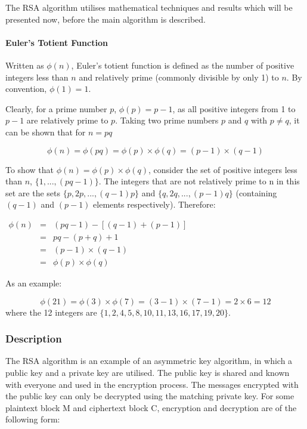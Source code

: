 \documentclass[a4paper,10pt]{report}
\begin{document}
The RSA algorithm utilises mathematical techniques and results which will be presented now, before the main algorithm is described.

\paragraph{Euler's Totient Function}

Written as $\phi(n)$, Euler's totient function is defined as the number of positive integers less than $n$ and relatively prime (commonly divisible by only 1) to $n$. By convention, $\phi(1) = 1$. 

Clearly, for a prime number $p$, $\phi(p) = p - 1$, as all positive integers from 1 to $p - 1$ are relatively prime to $p$. Taking two prime numbers $p$ and $q$ with $p \neq q$, it can be shown that for $n = pq$

\[\phi(n) = \phi(pq) = \phi(p) \times \phi(q) = (p - 1) \times (q - 1) \]

To show that $\phi(n) = \phi(p) \times \phi(q)$, consider the set of positive integers less than $n$, $\{1, ..., (pq - 1)\}$. The integers that are not relatively prime to n in this set are the sets $\{p,2p, ..., (q - 1)p\}$ and $\{q,2q, ..., (p - 1)q\}$ (containing $(q - 1)$ and $(p - 1)$ elements respectively). Therefore:

\begin{center}
$\begin{array}{lcl} \phi(n) & = & (pq - 1) - [(q - 1) + (p - 1)] \\  
			    & = & pq - (p + q) + 1 \\
			    & = & (p - 1) \times (q - 1) \\
			    & = & \phi(p) \times \phi(q) 
\end{array}$
\end{center}

As an example:

\[ \phi(21) = \phi(3) \times \phi(7) = (3 - 1) \times (7 - 1) = 2 \times 6 = 12 \]
where the 12 integers are $\{1,2,4,5,8,10,11,13,16,17,19,20\}$.

\subsubsection{Description}

The RSA algorithm is an example of an asymmetric key algorithm, in which a public key and a private key are utilised. The public key is shared and known with everyone and used in the encryption process. The messages encrypted with the public key can only be decrypted using the matching private key. For some plaintext block M and ciphertext block C, encryption and decryption are of the following form: 
\end{document}
